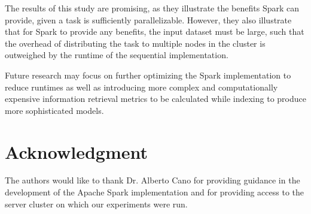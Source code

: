 \documentclass[conference]{IEEEtran}
\begin{document}
The results of this study are promising, as they illustrate the benefits Spark can provide, given a task is sufficiently parallelizable.  However, they also illustrate that for Spark to provide any benefits, the input dataset must be large, such that the overhead of distributing the task to multiple nodes in the cluster is outweighed by the runtime of the sequential implementation.    

Future research may focus on further optimizing the Spark implementation to reduce runtimes as well as introducing more complex and computationally expensive information retrieval metrics to be calculated while indexing to produce more sophisticated models.



\section*{Acknowledgment}
The authors would like to thank Dr. Alberto Cano for providing guidance in the development of the Apache Spark implementation and for providing access to the server cluster on which our experiments were run. 










%
%
%

\end{document}
